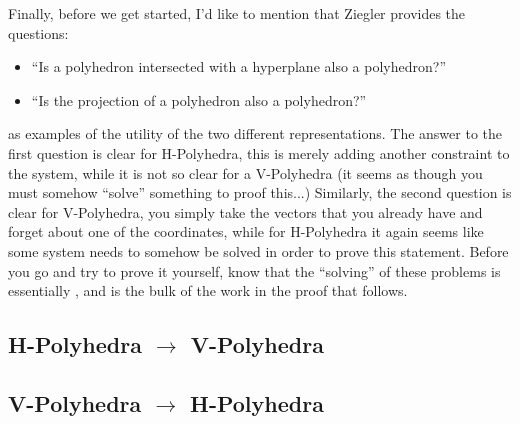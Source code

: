 \medskip
Finally, before we get started, I'd like to mention that Ziegler provides the questions:
\begin{itemize}
  \item ``Is a polyhedron intersected with a hyperplane also a polyhedron?''
  \item ``Is the projection of a polyhedron also a polyhedron?''
\end{itemize}
as examples of the utility of the two different representations.  The answer to the first question is clear for H-Polyhedra, this is merely adding another constraint to the system, while it is not so clear for a V-Polyhedra (it seems as though you must somehow ``solve'' something to proof this...)  Similarly, the second question is clear for V-Polyhedra, you simply take the vectors that you already have and forget about one of the coordinates, while for H-Polyhedra it again seems like some system needs to somehow be solved in order to prove this statement.  Before you go and try to prove it yourself, know that the ``solving'' of these problems is essentially \FME, and is the bulk of the work in the proof that follows.

\subsection{H-Polyhedra $\to$ V-Polyhedra}
\subsection{V-Polyhedra $\to$ H-Polyhedra}

